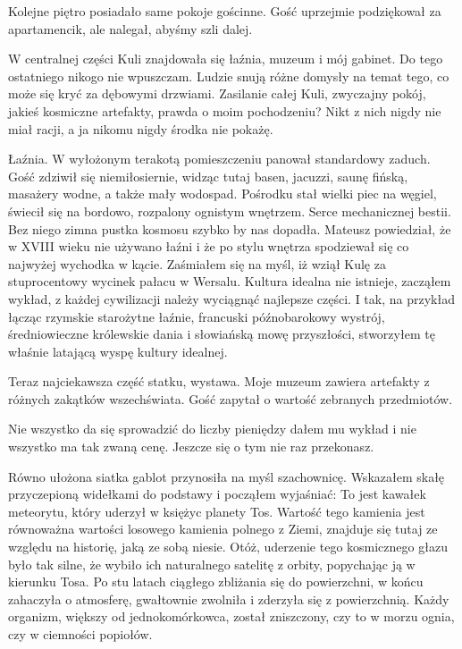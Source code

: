 Kolejne piętro posiadało same pokoje gościnne. 
Gość uprzejmie podziękował za apartamencik, ale nalegał, abyśmy szli dalej.

W centralnej części Kuli znajdowała się łaźnia, muzeum i mój gabinet. Do tego ostatniego nikogo nie wpuszczam.
Ludzie snują różne domysły na temat tego, co może się kryć za dębowymi drzwiami. 
Zasilanie całej Kuli, zwyczajny pokój, jakieś kosmiczne artefakty, prawda o moim pochodzeniu?
Nikt z nich nigdy nie miał racji, a ja nikomu nigdy środka nie pokażę.

Łaźnia. W wyłożonym terakotą pomieszczeniu panował standardowy zaduch. 
Gość zdziwił się niemiłosiernie, widząc tutaj basen, jacuzzi, saunę fińską, masażery wodne, a także mały wodospad.
Pośrodku stał wielki piec na węgiel, świecił się na bordowo, rozpalony ognistym wnętrzem. Serce mechanicznej bestii.
Bez niego zimna pustka kosmosu szybko by nas dopadła.
Mateusz powiedział, że w XVIII wieku nie używano łaźni i że po stylu wnętrza spodziewał się co najwyżej wychodka w kącie. 
Zaśmiałem się na myśl, iż wziął Kulę za stuprocentowy wycinek pałacu w Wersalu.
Kultura idealna nie istnieje, zacząłem wykład, z każdej cywilizacji należy wyciągnąć najlepsze części. 
I tak, na przykład łącząc rzymskie starożytne łaźnie, francuski późnobarokowy wystrój, średniowieczne królewskie dania i słowiańską mowę przyszłości, 
stworzyłem tę właśnie latającą wyspę kultury idealnej.

Teraz najciekawsza część statku, wystawa.
Moje muzeum zawiera artefakty z różnych zakątków wszechświata. Gość zapytał o wartość zebranych przedmiotów.
\begin{dialogue}
\ds{} Nie wszystko da się sprowadzić do liczby pieniędzy \dm{} dałem mu wykład \dm{} i nie wszystko ma tak zwaną cenę. 
Jeszcze się o tym nie raz przekonasz.
\end{dialogue}

Równo ułożona siatka gablot przynosiła na myśl szachownicę.
Wskazałem skałę przyczepioną widełkami do podstawy i począłem wyjaśniać:
To jest kawałek meteorytu, który uderzył w księżyc planety Tos. Wartość tego kamienia jest równoważna wartości losowego kamienia polnego z Ziemi, 
znajduje się tutaj ze względu na historię, jaką ze sobą niesie.
Otóż, uderzenie tego kosmicznego głazu było tak silne, że wybiło ich naturalnego satelitę z orbity, popychając ją w kierunku Tosa.
Po stu latach ciągłego zbliżania się do powierzchni, w końcu zahaczyła o atmosferę, gwałtownie zwolniła i zderzyła się z powierzchnią.
Każdy organizm, większy od jednokomórkowca, został zniszczony, czy to w morzu ognia, czy w ciemności popiołów.

